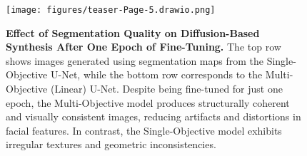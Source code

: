 
\begin{figure}[htbp]
    \centering
    \texttt{[image: figures/teaser-Page-5.drawio.png]}
    \caption{\textbf{Effect of Segmentation Quality on Diffusion-Based Synthesis After One Epoch of Fine-Tuning.}  
    The top row shows images generated using segmentation maps from the Single-Objective U-Net, while the bottom row corresponds to the Multi-Objective (Linear) U-Net. Despite being fine-tuned for just one epoch, the Multi-Objective model produces structurally coherent and visually consistent images, reducing artifacts and distortions in facial features. In contrast, the Single-Objective model exhibits irregular textures and geometric inconsistencies.}
    \label{fig:qualitative_results_comparison_diffusion}
\end{figure}

 
    
